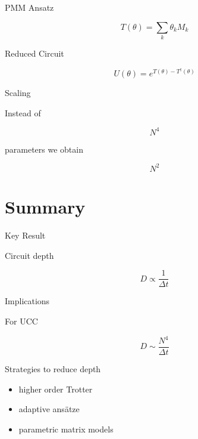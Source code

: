 \documentclass{beamer}
\begin{document}
\begin{frame}{PMM Ansatz}

  \[
  T(\theta)=\sum_k \theta_k M_k
  \]

\end{frame}

\begin{frame}{Reduced Circuit}

  \[
  U(\theta)
  =
  e^{T(\theta)-T^\dagger(\theta)}
  \]

\end{frame}

\begin{frame}{Scaling}

  Instead of

  \[
  N^4
  \]

  parameters we obtain

  \[
  N^2
  \]

\end{frame}

\section{Summary}

\begin{frame}{Key Result}

  Circuit depth

  \[
  D \propto \frac{1}{\Delta t}
  \]

\end{frame}

\begin{frame}{Implications}

  For UCC

  \[
  D \sim \frac{N^4}{\Delta t}
  \]

  Strategies to reduce depth

  \begin{itemize}
  \item higher order Trotter
  \item adaptive ansätze
  \item parametric matrix models
  \end{itemize}

\end{frame}
\end{document}
